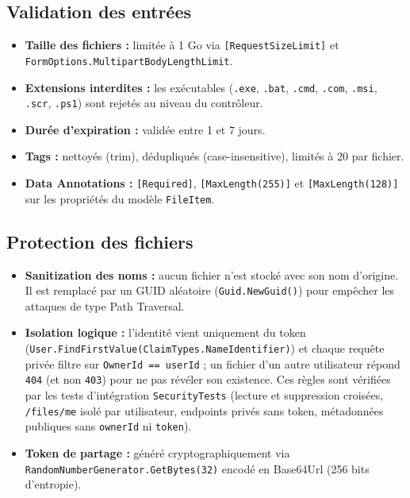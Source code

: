 \documentclass[12pt,a4paper]{article}
\begin{document}
\subsection{Validation des entr\'ees}

\begin{itemize}[nosep]
  \item \textbf{Taille des fichiers :} limit\'ee \`a 1 Go via \texttt{[RequestSizeLimit]} et \texttt{FormOptions.MultipartBodyLengthLimit}.
  \item \textbf{Extensions interdites :} les ex\'ecutables (\texttt{.exe}, \texttt{.bat}, \texttt{.cmd}, \texttt{.com}, \texttt{.msi}, \texttt{.scr}, \texttt{.ps1}) sont rejet\'es au niveau du contr\^oleur.
  \item \textbf{Dur\'ee d'expiration :} valid\'ee entre 1 et 7 jours.
  \item \textbf{Tags :} nettoy\'es (trim), d\'edupliqu\'es (case-insensitive), limit\'es \`a 20 par fichier.
  \item \textbf{Data Annotations :} \texttt{[Required]}, \texttt{[MaxLength(255)]} et \texttt{[MaxLength(128)]} sur les propri\'et\'es du mod\`ele \texttt{FileItem}.
\end{itemize}

\subsection{Protection des fichiers}

\begin{itemize}[nosep]
  \item \textbf{Sanitization des noms :} aucun fichier n'est stock\'e avec son nom d'origine. Il est remplac\'e par un GUID al\'eatoire (\texttt{Guid.NewGuid()}) pour emp\^echer les attaques de type Path Traversal.
  \item \textbf{Isolation logique :} l'identit\'e vient uniquement du token (\texttt{User.FindFirstValue(ClaimTypes.NameIdentifier)}) et chaque requ\^ete priv\'ee filtre sur \texttt{OwnerId == userId} ; un fichier d'un autre utilisateur r\'epond \texttt{404} (et non \texttt{403}) pour ne pas r\'ev\'eler son existence. Ces r\`egles sont v\'erifi\'ees par les tests d'int\'egration \texttt{SecurityTests} (lecture et suppression crois\'ees, \texttt{/files/me} isol\'e par utilisateur, endpoints priv\'es sans token, m\'etadonn\'ees publiques sans \texttt{ownerId} ni \texttt{token}).
  \item \textbf{Token de partage :} g\'en\'er\'e cryptographiquement via \texttt{RandomNumberGenerator.GetBytes(32)} encod\'e en Base64Url (256 bits d'entropie).
\end{itemize}
\end{document}
